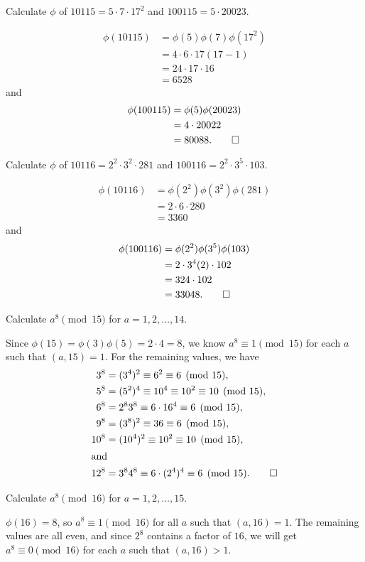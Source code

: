  Calculate $\phi$ of $10115 = 5\cdot7\cdot17^2$ and
$100115 = 5\cdot20023$.
\begin{solution}
  \begin{align*}
    \phi(10115) &= \phi(5)\phi(7)\phi(17^2) \\
                &= 4\cdot6\cdot17(17-1) \\
                &= 24\cdot17\cdot16 \\
                &= 6528
  \end{align*}
  and
  \begin{align*}
    \phi(100115) &= \phi(5)\phi(20023) \\
                 &= 4\cdot20022 \\
                 &= 80088. \qedhere
  \end{align*}
\end{solution}

 Calculate $\phi$ of $10116 = 2^2\cdot3^2\cdot281$ and
$100116 = 2^2\cdot3^5\cdot103$.
\begin{solution}
  \begin{align*}
    \phi(10116) &= \phi(2^2)\phi(3^2)\phi(281) \\
                &= 2\cdot6\cdot280 \\
                &= 3360
  \end{align*}
  and
  \begin{align*}
    \phi(100116) &= \phi(2^2)\phi(3^5)\phi(103) \\
                 &= 2\cdot3^4(2)\cdot102 \\
                 &= 324\cdot102 \\
                 &= 33048. \qedhere
  \end{align*}
\end{solution}

 Calculate $a^8\pmod{15}$ for $a = 1,2,\dots,14$.
\begin{solution}
  Since $\phi(15) = \phi(3)\phi(5) = 2\cdot4 = 8$, we know
  $a^8\equiv1\pmod{15}$ for each $a$ such that $(a,15) = 1$. For the
  remaining values, we have
  \begin{align*}
    3^8 &= (3^4)^2 \equiv 6^2 \equiv 6\pmod{15}, \\
    5^8 &= (5^2)^4 \equiv 10^4 \equiv 10^2 \equiv 10\pmod{15}, \\
    6^8 &= 2^83^8 \equiv 6\cdot16^4 \equiv 6\pmod{15}, \\
    9^8 &= (3^8)^2 \equiv 36 \equiv 6 \pmod{15}, \\
    10^8 &= (10^4)^2 \equiv 10^2 \equiv 10\pmod{15}, \\
    \intertext{and}
    12^8 &= 3^84^8 \equiv 6\cdot(2^4)^4 \equiv 6\pmod{15}. \qedhere
  \end{align*}
\end{solution}

 Calculate $a^8\pmod{16}$ for $a = 1,2,\dots,15$.
\begin{solution}
  $\phi(16) = 8$, so $a^8\equiv1\pmod{16}$ for all $a$ such that
  $(a,16) = 1$. The remaining values are all even, and since $2^8$
  contains a factor of $16$, we will get $a^8\equiv0\pmod{16}$ for
  each $a$ such that $(a,16) > 1$.
\end{solution}
